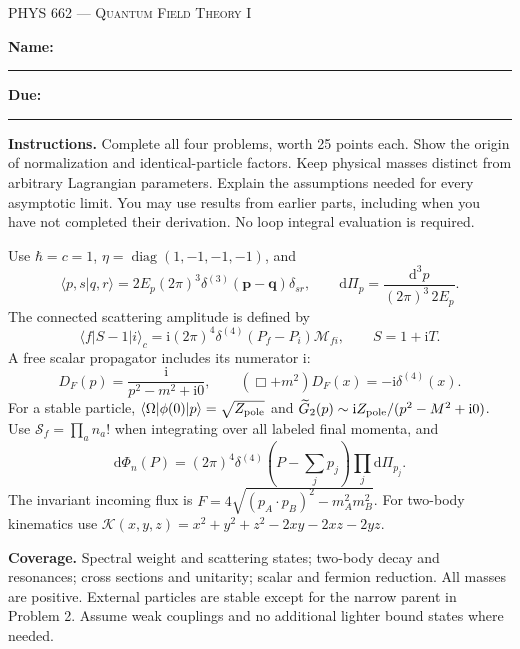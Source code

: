 \documentclass[11pt]{article}
\newcommand{\dd}{\mathrm d}
\newcommand{\ii}{\mathrm i}
\newcommand{\diag}{\operatorname{diag}}
\newcommand{\dPi}{\dd\Pi}
\newcommand{\cM}{\mathcal M}
\newcommand{\cS}{\mathcal S}
\newcommand{\Zp}{Z_{\rm pole}}
\newcommand{\Kallen}{\mathcal K}
\begin{document}
\begin{center}
{\scshape\Large PHYS 662 --- Quantum Field Theory I\par}
\vspace{0.3em}{\large Scattering States, Rates, and LSZ Reduction\par}
\vspace{0.3em}{\large Lectures 23--25 \quad Fall 2026\par}
\end{center}\medskip
\textbf{Name:} \rule{0.43\textwidth}{0.4pt}\hfill
\textbf{Due:} \rule{0.24\textwidth}{0.4pt}

\textbf{Instructions.} Complete all four problems, worth 25 points each.
Show the origin of normalization and identical-particle factors. Keep
physical masses distinct from arbitrary Lagrangian parameters. Explain
the assumptions needed for every asymptotic limit. You may use results
from earlier parts, including when you have not completed their derivation.
No loop integral evaluation is required.

\begin{keyidea}
Use \(\hbar=c=1\), \(\eta=\diag(1,-1,-1,-1)\), and
\[
 \langle p,s|q,r\rangle=2E_p(2\pi)^3\delta^{(3)}(\bm p-\bm q)\delta_{sr},
 \qquad \dPi_p=\frac{\dd^3p}{(2\pi)^3\,2E_p}.
\]
The connected scattering amplitude is defined by
\[
 \langle f|S-1|i\rangle_c
 =\ii(2\pi)^4\delta^{(4)}(P_f-P_i)\cM_{fi},\qquad S=1+\ii T.
\]
A free scalar propagator includes its numerator \(\ii\):
\[
 D_F(p)=\frac{\ii}{p^2-m^2+\ii0},\qquad
 (\Box+m^2)D_F(x)=-\ii\delta^{(4)}(x).
\]
For a stable particle, \(\langle\Omega|\phi(0)|p\rangle=\sqrt{\Zp}\)
and \(\widetilde G_2(p)\sim\ii\Zp/(p^2-M^2+\ii0)\).
Use \(\cS_f=\prod_a n_a!\) when integrating over all labeled final momenta,
and
\[
 \dd\Phi_n(P)=(2\pi)^4\delta^{(4)}\!\left(P-\sum_jp_j\right)\prod_j\dPi_{p_j}.
\]
The invariant incoming flux is
\(F=4\sqrt{(p_A\cdot p_B)^2-m_A^2m_B^2}\).
For two-body kinematics use
\(\Kallen(x,y,z)=x^2+y^2+z^2-2xy-2xz-2yz\).
\end{keyidea}

\textbf{Coverage.} Spectral weight and scattering states; two-body decay
and resonances; cross sections and unitarity; scalar and fermion reduction.
All masses are positive. External particles are stable except for the
narrow parent in Problem 2. Assume weak couplings and no additional lighter
bound states where needed.
\end{document}
